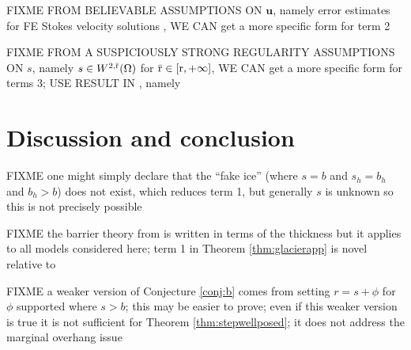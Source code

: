 \documentclass[hidelinks,onefignum,onetabnum,final]{siamart220329}  %
\newcommand{\bu}{\mathbf{u}}
\newcommand{\rr}{{\text{\textnormal{r}}}}
\begin{document}
FIXME FROM BELIEVABLE ASSUMPTIONS ON $\bu$, namely error estimates for FE Stokes velocity solutions \cite{Elmanetal2014}, WE CAN get a more specific form for term 2

FIXME FROM A SUSPICIOUSLY STRONG REGULARITY ASSUMPTIONS ON $s$, namely $s\in W^{2,\bar \rr}(\Omega)$ for $\bar \rr \in [\rr,+\infty]$, WE CAN get a more specific form for terms 3; USE RESULT IN \cite{JouvetBueler2012}, namely \cite[Theorem 3.1.6]{Ciarlet2002}


\section{Discussion and conclusion} \label{sec:conclusion}

FIXME one might simply declare that the ``fake ice'' (where $s=b$ and $s_h=b_h$ and $b_h>b$) does not exist, which reduces term 1, but generally $s$ is unknown so this is not precisely possible

FIXME the barrier theory from \cite{Bueler2021conservation} is written in terms of the thickness but it applies to all models considered here; term 1 in Theorem \ref{thm:glacierapp} is novel relative to \cite{Bueler2021conservation}

FIXME a weaker version of Conjecture \ref{conj:b} comes from setting $r=s + \phi$ for $\phi$ supported where $s>b$; this may be easier to prove;  even if this weaker version is true it is not sufficient for Theorem \ref{thm:stepwellposed}; it does not address the marginal overhang issue




\end{document}
